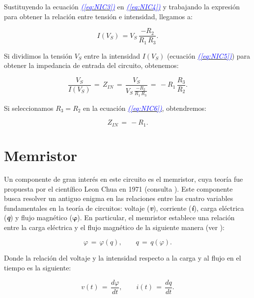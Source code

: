 \documentclass[12pt,a4paper]{report} %
\newcommand{\eref}[1]{\hyperref[#1]{\textcolor{blue}{\textit{(\ref*{#1})}}}}
\begin{document}
	\noindent Sustituyendo la ecuación \eref{eq:NIC3} en \eref{eq:NIC4} y trabajando la expresión para obtener la relación entre tensión e intensidad, llegamos a:
	
	\begin{equation}
		I(V_S)\,=V_S\,\frac{-R_2}{R_1 \, R_3}.
		\label{eq:NIC5}
	\end{equation}\smallskip
	
	\noindent Si dividimos la tensión $V_S$ entre la intensidad $I(V_S)$ (ecuación \eref{eq:NIC5}) para obtener la impedancia de entrada del circuito, obtenemos:
	
	\begin{equation}
		\frac{V_S}{I(V_S)}\,=\,Z_{IN}\,=\,\frac{V_S}{V_S\,\frac{-R_2}{R_1 \, R_3}}\,=\,-R_1\,\frac{R_3}{R_2}.
		\label{eq:NIC6}
	\end{equation}\smallskip
	
	\noindent Si seleccionamos $R_3 = R_2$ en la ecuación \eref{eq:NIC6}, obtendremos:
	
	\begin{equation}
		Z_{IN}\,=\,-R_1.
		\label{eq:NIC7}
	\end{equation}\smallskip
	
	\newpage
	\section{Memristor}
	\noindent Un componente de gran interés en este circuito es el memristor, cuya teoría fue propuesta por el científico Leon Chua en 1971 (consulta \cite{chuamissing1971}). Este componente busca resolver un antiguo enigma en las relaciones entre las cuatro variables fundamentales en la teoría de circuitos: voltaje (\textbf{\textit{v}}), corriente (\textbf{\textit{i}}), carga eléctrica (\textbf{\textit{q}}) y flujo magnético (\textit{$\bm{\varphi}$}). En particular, el memristor establece una relación entre la carga eléctrica y el flujo magnético de la siguiente manera (ver \cite{chuaoscillator2008}):
	
	\begin{equation}
		\varphi\,=\,\varphi(q), \qquad q\,=\,q(\varphi).
		\label{eq:flujocarga}
	\end{equation}\smallskip
	
	\noindent Donde la relación del voltaje y la intensidad respecto a la carga y al flujo en el tiempo es la siguiente:

	\begin{equation}
		v(t)\,=\,\frac{d\varphi}{dt}, \qquad i(t)\,=\,\frac{dq}{dt}.
		\label{eq:dvdi}
	\end{equation}
			
\end{document}
